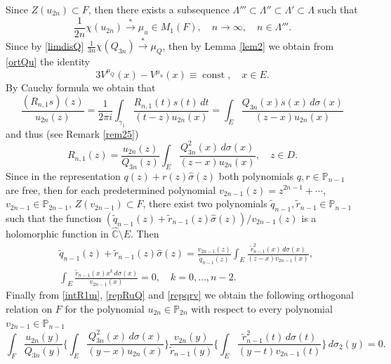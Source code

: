 \documentclass[11pt, a4paper, twoside]{article}
\let\myh\widehat
\let\myt\widetilde
\def\CC{\mathbb C}
\def\PP{\mathbb P}
\def\const{\operatorname{const}}
\theoremstyle{plain}
\theoremstyle{definition}
\begin{document}
Since  $Z(u_{2n})\subset F$, then there exists a subsequence $\Lambda'''\subset \Lambda''\subset \Lambda'\subset \Lambda$ such that
\begin{equation}
\frac1{2n}\chi(u_{2n}){\overset{*}\longrightarrow}\mu_u\in M_1(F),
\quad n\to\infty,\quad n\in\Lambda'''.
\label{limdisu}
\end{equation}
Since by \eqref{limdisQ} $\frac1{3n}\chi(Q_{3n}){\overset{*}\longrightarrow}\mu_Q$, then by Lemma \ref{lem2} we obtain from \eqref{ortQu} the identity
\begin{equation}
3V^{\mu_Q}(x)-V^{\mu_u}(x)\equiv\const,
\quad x\in E.
\label{equQu}
\end{equation}
By Cauchy formula we obtain that
\begin{equation}
\frac{(R_{n,1}s)(z)}{u_{2n}(z)}
=\frac1{2\pi i}
\int_{\gamma_1}\frac{R_{n,1}(t)s(t)\,dt}
{(t-z)u_{2n}(x)}
=\int_E\frac{Q_{3n}(x)s(x)\,d\sigma(x)}{(z-x)u_{2n}(x)}
\label{repRu}
\end{equation}
and thus (see Remark \ref{rem25})
\begin{equation}
R_{n,1}(z)=\frac{u_{2n}(z)}{Q_{3n}(z)}
\int_E\frac{Q^2_{3n}(x)\,d\sigma(x)}{(z-x)u_{2n}(x)},
\quad z\in D.
\label{repRuQ}
\end{equation}
Since in the representation $q(z)+r(z)\myh{\sigma}(z)$ both polynomials $q,r\in\PP_{n-1}$ are free, then for each predetermined polynomial $v_{2n-1}(z)=z^{2n-1}+\dotsb$, $v_{2n-1}\in\PP_{2n-1}$, $Z(v_{2n-1})\subset  F$, there exist two polynomials $\myt{q}_{n-1},\myt{r}_{n-1}\in\PP_{n-1}$ such that the function $(\myt{q}_{n-1}(z)+\myt{r}_{n-1}(z)\myh{\sigma}(z))/v_{2n-1}(z)$ is a holomorphic function in $\myh{\CC}\setminus E$. Then
\begin{align}
&\myt{q}_{n-1}(z)+\myt{r}_{n-1}(z)\myh{\sigma}(z)=
\frac{v_{2n-1}(z)}{\myt{q}_{n-1}(z)}
\int_E \frac{\myt{r}^2_{n-1}(x)\,d\sigma(x)}{(z-x)v_{2n-1}(x)},
\label{repqrv}\\
&\int_E \frac{\myt{r}_{n-1}(x)x^k\,d\sigma(x)}{v_{2n-1}(x)}=0,
\quad k=0,\dots,n-2.
\label{ortrv}
\end{align}
Finally from \eqref{intR1m}, \eqref{repRuQ} and \eqref{repqrv} we obtain the following orthogonal relation on $F$ for the polynomial $u_{2n}\in\PP_{2n}$  with respect to  every polynomial $v_{2n-1}\in\PP_{n-1}$ 
\begin{equation}
\int_F\frac{u_{2n}(y)}{Q_{3n}(y)}
\biggl\{
\int_E\frac{Q^2_{3n}(x)\,d\sigma(x)}{(y-x)u_{2n}(x)}
\biggr\}\frac{v_{2n}(y)}{\myt{r}_{n-1}(y)}
\biggl\{\int_E\frac{\myt{r}^2_{n-1}(t)\,d\sigma(t)}{(y-t)v_{2n-1}(t)}\biggr\}\,d\sigma_2(y)=0.
\label{ortuQ}
\end{equation}
\end{document}
